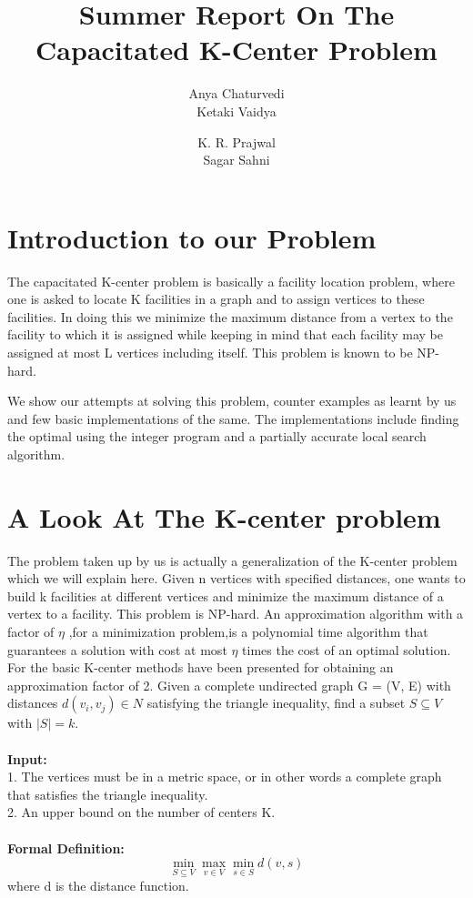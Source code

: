\documentclass[12pt,a4paper,onecolumn]{article}
\author{Anya Chaturvedi \\ Ketaki Vaidya \and K. R. Prajwal \\ Sagar Sahni  }
\title{Summer Report On The Capacitated K-Center Problem}
\begin{document}
\maketitle
\section{Introduction to our Problem}
The capacitated K-center problem is basically a facility location problem, where one is asked to locate K facilities in a graph and to assign vertices to these facilities. In doing this we minimize
the maximum distance from a vertex to the facility to which it is assigned while keeping in mind that each facility may be assigned at most L vertices including itself. This problem is known to be NP-hard.

We show our attempts at solving this problem, counter examples as learnt by us and few basic implementations of the same. The implementations include finding the optimal using the integer program and a partially accurate local search algorithm.
\section{A Look At The K-center problem}
The problem taken up by us is actually a generalization of the K-center problem which we will explain here. Given n vertices with specified distances, one wants to build k facilities at different vertices and minimize the maximum distance of a vertex to a facility. This problem is NP-hard. An approximation algorithm with a factor of $\eta$ ,for a minimization problem,is
a polynomial time algorithm that guarantees a solution with cost at most $\eta$ times the cost of an optimal solution. For the basic K-center methods have been presented for obtaining an approximation factor of 2. Given a complete undirected graph G = (V, E) with distances $d(v_i, v_j) \in N$ satisfying the triangle inequality, find a subset $S \subseteq V$ with $|S| = k$.\\\\
 \textbf{Input:}\\1. The vertices must be in a metric space, or in other words a complete graph that satisfies the triangle inequality.\\2. An
upper bound on the number of centers K.\\\\
\textbf{Formal Definition:}\\
$$\min_{S \subseteq V}\max_{v \in V}\min_{s \in S}d(v,s)$$
where d is the distance function.
\end{document}
